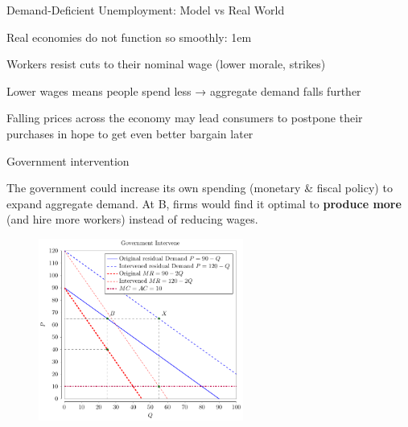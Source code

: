 \documentclass[11pt,aspectratio=43,usenames,dvipsnames]{beamer}
\let\olditemize=\itemize
\let\endolditemize=\enditemize
\renewenvironment{itemize}{\olditemize \itemsep1em}{\endolditemize}
\theoremstyle{definition}
\begin{document}
\begin{frame}[allowframebreaks]{Demand-Deficient Unemployment: Model vs Real World}
    \framebreak

    Real economies do not function so smoothly:
    \begin{itemize}
        \item Workers resist cuts to their nominal wage (lower morale, strikes)
        \item Lower wages means people spend less → aggregate demand falls further
        \item Falling prices across the economy may lead consumers to postpone their purchases in hope to get even better bargain later
    \end{itemize}

\end{frame}

\begin{frame}{Government intervention}
\label{slide:Government_intervention}

            The government could increase its own spending (monetary \& fiscal policy) to expand aggregate demand.
             At B, firms would find it optimal to \textbf{produce more} (and hire more workers) instead of reducing wages.
            \begin{figure}
                \centering
                \includegraphics [width=0.6\textwidth]{./figures/build/GovIntervene.pdf}
            \end{figure}
\end{frame}
\end{document}
